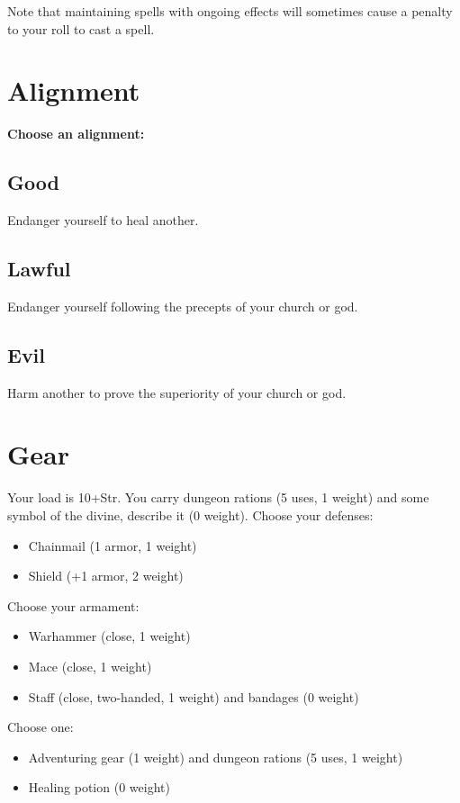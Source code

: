 Note that maintaining spells with ongoing effects will sometimes cause a penalty to your roll to cast a spell.
\section*{Alignment}

{\bfseries Choose an alignment:}
\subsection{Good}

Endanger yourself to heal another.
\subsection{Lawful}

Endanger yourself following the precepts of your church or god.
\subsection{Evil}

Harm another to prove the superiority of your church or god.
\section*{Gear}

Your load is 10+Str. You carry dungeon rations (5 uses, 1 weight) and some symbol of the divine, describe it (0 weight). Choose your defenses:
\begin{itemize}
\item Chainmail (1 armor, 1 weight)
\item Shield (+1 armor, 2 weight)

\end{itemize}

Choose your armament:
\begin{itemize}
\item Warhammer (close, 1 weight)
\item Mace (close, 1 weight)
\item Staff (close, two-handed, 1 weight) and bandages (0 weight)

\end{itemize}

Choose one:
\begin{itemize}
\item Adventuring gear (1 weight) and dungeon rations (5 uses, 1 weight)
\item Healing potion (0 weight)

\end{itemize}
